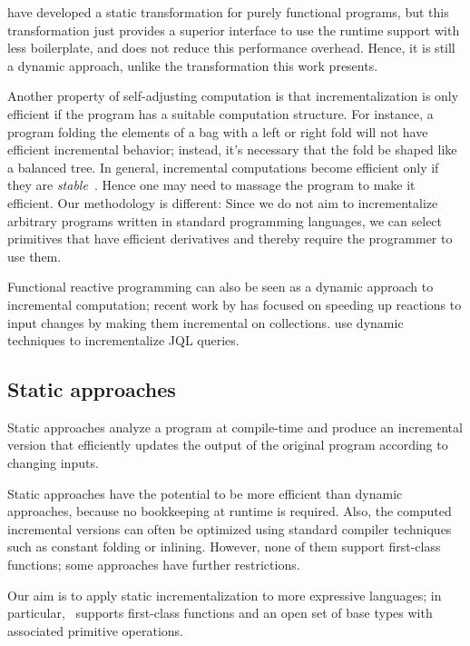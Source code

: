 \citet{Chen11} have developed a static transformation for purely
functional programs, but this transformation just provides a superior interface to use
the runtime support with less boilerplate, and does not reduce
this performance overhead. Hence, it is still a dynamic approach, unlike
the transformation this work presents.

Another property of self-adjusting computation
is that incrementalization is only efficient if the program has a suitable
computation structure. For instance, a program
folding the elements of a bag with a left or right fold will not
have efficient incremental behavior; instead, it's necessary that
the fold be shaped like a balanced tree. In general,
incremental computations become efficient only if they are \emph{stable}~\citep{Acar05}.
Hence one may need to massage the program to make it efficient. Our methodology is 
different: Since we do not aim to incrementalize arbitrary programs written in standard
programming languages, we can select primitives that have efficient derivatives and thereby require 
the programmer to use them.

Functional reactive programming \citep{Elliott:1997:FRA:258948.258973}
can also be seen as a dynamic approach to incremental computation;
recent work by \citet{Maier2013} has
focused on speeding up reactions to input changes by making them
incremental on collections. \citet{Willis08} use dynamic techniques
 to incrementalize JQL queries.

\subsection{Static approaches}
Static approaches analyze a program at compile-time and produce an
incremental version that efficiently updates the output
of the original program according to changing inputs.

Static approaches have the potential to be more efficient than dynamic approaches,
because no bookkeeping at runtime is required. Also, the computed incremental
versions can often be optimized using standard compiler techniques
such as constant folding or inlining.
However, none of them support first-class functions; some
approaches have further restrictions.

Our aim is to apply static incrementalization to more expressive languages;
in particular, \ILC\ supports first-class functions and an open
set of base types with associated primitive operations.

